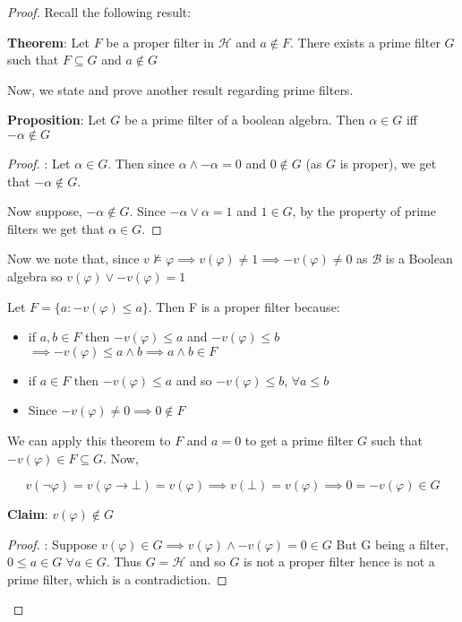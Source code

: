 \documentclass[12pt]{article}
\begin{document}
\begin{proof}
Recall the following result:

\textbf{Theorem}: Let $F$ be a proper filter in $\mathcal{H}$ and $a \not \in F$. There exists a prime filter $G$ such that $F \subseteq G$ and $a \not \in G$

Now, we state and prove another result regarding prime filters.

\textbf{Proposition}: Let $G$ be a prime filter of a boolean algebra. Then $\alpha \in G$ iff $-\alpha \not \in G$

\begin{proof}: Let $\alpha \in G$. Then since $\alpha \wedge -\alpha = 0$ and $0 \not \in G$ (as $G$ is proper), we get that $-\alpha \not \in G$.

Now suppose, $-\alpha \not \in G$. Since $-\alpha \vee \alpha = 1$ and $1 \in G$, by the property of prime filters we get that $\alpha \in G$.
\end{proof}

Now we note that, since $v \not \models \varphi \implies v(\varphi) \neq 1 \implies -v(\varphi) \neq 0$ as $\mathcal{B}$ is a Boolean algebra so $v(\varphi) \vee -v(\varphi) = 1$

Let $F = \{a : -v(\varphi) \leq a\}$. Then F is a proper filter because:
\begin{itemize}
    \item if $a,b \in F$ then $-v(\varphi) \leq a$ and $-v(\varphi) \leq b$ $\implies -v(\varphi) \leq a \wedge b \implies a \wedge b \in F$
    \item if $a \in F$ then $-v(\varphi) \leq a$ and so $-v(\varphi) \leq b$, $\forall a \leq b$
    \item Since $-v(\varphi) \neq 0 \implies 0 \not \in F$
\end{itemize}

We can apply this theorem to $F$ and $a = 0$ to get a prime filter $G$ such that $-v(\varphi) \in F \subseteq G$. Now,

$$v(\neg \varphi) = v(\varphi \rightarrow \bot) = v(\varphi) \implies v(\bot) = v(\varphi) \implies 0 = -v(\varphi) \in G$$

\textbf{Claim}: $v(\varphi) \not \in G$
\begin{proof}: Suppose $v(\varphi) \in G \implies v(\varphi) \wedge -v(\varphi) = 0 \in G$ But G being a filter, $0 \leq a \in G$ $\forall a \in G$. Thus $G = \mathcal{H}$ and so $G$ is not a proper filter hence is not a prime filter, which is a contradiction.
\end{proof}


\end{proof}
\end{document}
